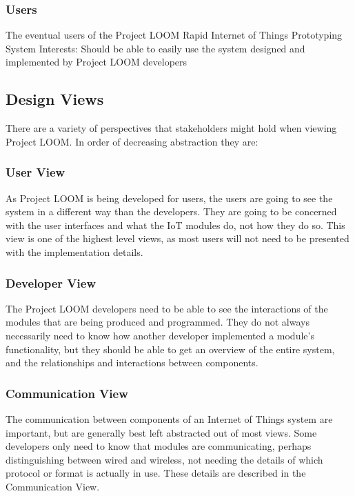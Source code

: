 \documentclass[onecolumn, draftclsnofoot,10pt, compsoc]{IEEEtran}
\begin{document}
\subsubsection{Users}
    The eventual users of the Project LOOM Rapid Internet of Things Prototyping System
    Interests: Should be able to easily use the system designed and implemented by Project LOOM developers

\subsection{Design Views}
    There are a variety of perspectives that stakeholders might hold when viewing Project LOOM. In order of decreasing abstraction they are:

\subsubsection{User View}
    As Project LOOM is being developed for users, the users are going to see the system in a different way than the developers. They are going to be concerned with the user interfaces and what the IoT modules do, not how they do so. This view is one of the highest level views, as most users will not need to be presented with the implementation details.

\subsubsection{Developer View}
    The Project LOOM developers need to be able to see the interactions of the modules that are being produced and programmed. They do not always necessarily need to know how another developer implemented a module's functionality, but they should be able to get an overview of the entire system, and the relationships and interactions between components.

\subsubsection{Communication View}
    The communication between components of an Internet of Things system are important, but are generally best left abstracted out of most views. Some developers only need to know that modules are communicating, perhaps distinguishing between wired and wireless, not needing the details of which protocol or format is actually in use. These details are described in the Communication View.
\end{document}
